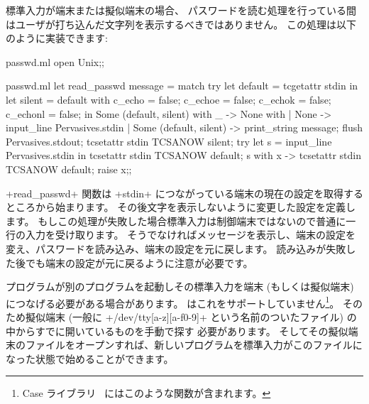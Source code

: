 \begin{example}
標準入力が端末または擬似端末の場合、
パスワードを読む処理を行っている間はユーザが打ち込んだ文字列を表示するべきではありません。
この処理は以下のように実装できます:
%
\begin{codefile}{passwd.ml}
open Unix;;
\end{codefile}
%
\begin{listingcodefile}{passwd.ml}
let read_passwd message =
  match
    try
      let default = tcgetattr stdin in
      let silent =
        { default with
          c_echo = false;
          c_echoe = false;
          c_echok = false;
          c_echonl = false;
        } in
      Some (default, silent)
    with _ -> None
  with
  | None -> input_line Pervasives.stdin
  | Some (default, silent) ->
      print_string message;
      flush Pervasives.stdout;
      tcsetattr stdin TCSANOW silent;
      try
        let s = input_line Pervasives.stdin in
        tcsetattr stdin TCSANOW default; s
      with x ->
        tcsetattr stdin TCSANOW default; raise x;;
\end{listingcodefile}
%
\ml+read_passwd+ 関数は \ml+stdin+ につながっている端末の現在の設定を取得するところから始まります。
その後文字を表示しないように変更した設定を定義します。
もしこの処理が失敗した場合標準入力は制御端末ではないので普通に一行の入力を受け取ります。
そうでなければメッセージを表示し、端末の設定を変え、パスワードを読み込み、端末の設定を元に戻します。
読み込みが失敗した後でも端末の設定が元に戻るように注意が必要です。
\end{example}

%
プログラムが別のプログラムを起動しその標準入力を端末 (もしくは擬似端末) につなげる必要がある場合があります。
\ocaml はこれをサポートしていません\footnote{Case ライブラリ~\cite{Cash} にはこのような関数が含まれます。}。
そのため擬似端末 (一般に \ml+/dev/tty[a-z][a-f0-9]+ という名前のついたファイル) の中からすでに開いているものを手動で探す
必要があります。
そしてその擬似端末のファイルをオープンすれば、新しいプログラムを標準入力がこのファイルになった状態で始めることができます。


